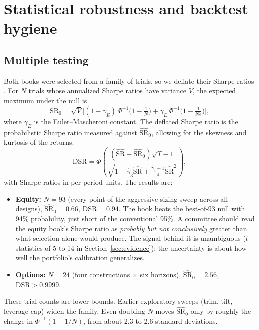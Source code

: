 \documentclass[11pt]{article}
\theoremstyle{definition}
\newcommand{\1}{\mathbf{1}}
\begin{document}
\section{Statistical robustness and backtest hygiene}\label{sec:audit}

\subsection{Multiple testing}

Both books were selected from a family of trials, so we deflate their Sharpe ratios
\citep{BaileyLopezdePrado2014}. For $N$ trials whose annualized Sharpe ratios have
variance $V$, the expected maximum under the null is
\begin{equation}
  \widehat{\mathrm{SR}}_0=\sqrt{V}\Big[(1-\gamma_E)\,\Phi^{-1}\!\big(1-\tfrac1N\big)+\gamma_E\,\Phi^{-1}\!\big(1-\tfrac{1}{Ne}\big)\Big],
\end{equation}
where $\gamma_E$ is the Euler--Mascheroni constant. The deflated Sharpe ratio is the
probabilistic Sharpe ratio \citep{BaileyLopezdePrado2012} measured against
$\widehat{\mathrm{SR}}_0$, allowing for the skewness and kurtosis of the returns:
\begin{equation}
  \mathrm{DSR}=\Phi\!\left(\frac{(\widehat{\mathrm{SR}}-\widehat{\mathrm{SR}}_0)\sqrt{T-1}}{\sqrt{1-\hat\gamma_3\widehat{\mathrm{SR}}+\tfrac{\hat\gamma_4-1}{4}\widehat{\mathrm{SR}}^2}}\right),
\end{equation}
with Sharpe ratios in per-period units. The results are:
\begin{itemize}
  \item \textbf{Equity:} $N=93$ (every point of the aggressive sizing sweep across all
        designs), $\widehat{\mathrm{SR}}_0=0.66$, $\mathrm{DSR}=0.94$. The book beats the
        best-of-93 null with 94\% probability, just short of the conventional 95\%. A
        committee should read the equity book's Sharpe ratio as \emph{probably but not
        conclusively} greater than what selection alone would produce. The signal behind it
        is unambiguous ($t$-statistics of 5 to 14 in Section~\ref{sec:evidence}); the
        uncertainty is about how well the portfolio's calibration generalizes.
  \item \textbf{Options:} $N=24$ (four constructions $\times$ six horizons),
        $\widehat{\mathrm{SR}}_0=2.56$, $\mathrm{DSR}>0.9999$.
\end{itemize}
These trial counts are lower bounds. Earlier exploratory sweeps (trim, tilt, leverage cap)
widen the family. Even doubling $N$ moves $\widehat{\mathrm{SR}}_0$ only by roughly the
change in $\Phi^{-1}(1-1/N)$, from about 2.3 to 2.6 standard deviations.
\end{document}
